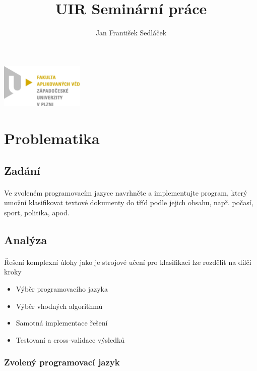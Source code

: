 \documentclass[a4paper,12pt]{article}
\title{UIR Seminární práce}
\author{Jan František Sedláček}
\begin{document}
\clearpage\maketitle
\thispagestyle{empty}

\begin{center}
  \includegraphics[width=150px]{logo1.jpeg}
\end{center}

\pagebreak

\tableofcontents
\pagebreak

\section{Problematika}
\subsection{Zadání}
\paragraph{}
Ve zvoleném programovacím jazyce navrhněte a implementujte program, který umožní
klasifikovat textové dokumenty do tříd podle jejich obsahu, např. počasí, sport, politika,
apod.
\subsection{Analýza}
\paragraph{}
Řešení komplexní úlohy jako je strojové učení pro klasifikaci lze rozdělit na dílčí kroky 

\begin{itemize}
  \item Výběr programovacího jazyka
  \item Výběr vhodných algorithmů
  \item Samotná implementace řešení
  \item Testovaní a cross-validace výsledků
\end{itemize}

\subsubsection{Zvolený programovací jazyk}
\end{document}
